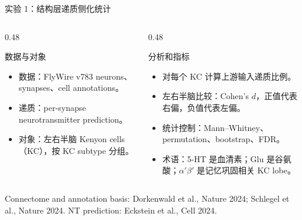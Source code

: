\documentclass[aspectratio=169,10pt,fontset=none]{ctexbeamer}
\newcommand{\refs}[1]{\vfill{\tiny\textcolor{FlyDark}{#1}}}
\begin{document}
\begin{frame}{实验 1：结构层递质侧化统计}
\small
\begin{columns}[T,onlytextwidth]
  \begin{column}{0.48\textwidth}
    \begin{block}{数据与对象}
      \begin{itemize}
        \item 数据：FlyWire v783 neurons、synapses、cell annotations。
        \item 递质：per-synapse neurotransmitter prediction。
        \item 对象：左右半脑 Kenyon cells（KC），按 KC subtype 分组。
      \end{itemize}
    \end{block}
  \end{column}
  \begin{column}{0.48\textwidth}
    \begin{block}{分析和指标}
      \begin{itemize}
        \item 对每个 KC 计算上游输入递质比例。
        \item 左右半脑比较：Cohen's $d$，正值代表右偏，负值代表左偏。
        \item 统计控制：Mann--Whitney、permutation、bootstrap、FDR。
        \item 术语：5-HT 是血清素；Glu 是谷氨酸；$\alpha'\beta'$ 是记忆巩固相关 KC lobe。
      \end{itemize}
    \end{block}
  \end{column}
\end{columns}
\refs{Connectome and annotation basis: Dorkenwald et al., Nature 2024; Schlegel et al., Nature 2024. NT prediction: Eckstein et al., Cell 2024.}
\end{frame}
\end{document}
